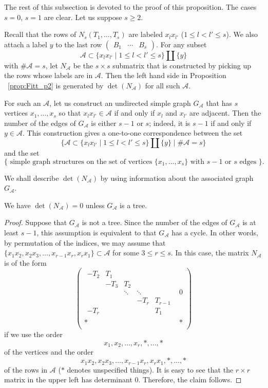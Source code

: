 \documentclass[11pt]{article}
\theoremstyle{definition}
\numberwithin{equation}{section}
\newcommand{\cA}{\mathcal{A}}
\begin{document}
The rest of this subsection is devoted to the proof of this proposition.
The cases $s = 0$, $s = 1$ are clear.
Let us suppose $s \geq 2$.

Recall that the rows of $N_s(T_1, \dots, T_s)$ are labeled $x_l x_{l'}$ ($1 \leq l < l' \leq s$).
We also attach a label $y$ to the last row $\begin{pmatrix} B_1 & \cdots & B_s \end{pmatrix}$.
For any subset 
\[
\cA \subset \{x_l x_{l'} \mid 1 \leq l < l' \leq s\} \amalg \{y\}
\]
with $\# \cA = s$, let $N_{\cA}$ be the $s \times s$ submatrix that is constructed by picking up the rows whose labels are in $\cA$.
Then the left hand side in Proposition ~\ref{prop:Fitt_p2} is generated by $\det(N_{\cA})$ for all such $\cA$.

For such an $\cA$, let us construct an undirected simple graph $G_{\cA}$ that has $s$ vertices $x_1, \dots, x_s$ so that $x_l x_{l'} \in \cA$ if and only if $x_l$ and $x_{l'}$ are adjacent.
Then the number of the edges of $G_{\cA}$ is either $s-1$ or $s$; indeed, it is $s-1$ if and only if $y \in \cA$.
This construction gives a one-to-one correspondence between the set
\[
\{ \cA \subset \{x_l x_{l'} \mid 1 \leq l < l' \leq s\} \amalg \{y\} \mid \# \cA = s\}
\]
and the set
\[
\{ \text{ simple graph structures on the set of vertices $\{x_1, \dots, x_s\}$ with $s-1$ or $s$ edges }\}.
\]

We shall describe $\det(N_{\cA})$ by using information about the associated graph $G_{\cA}$.

\begin{claim}\label{claim2}
We have $\det(N_{\cA}) = 0$ unless $G_{\cA}$ is a tree.
\end{claim}

\begin{proof}
Suppose that $G_{\cA}$ is not a tree.
Since the number of the edges of $G_{\cA}$ is at least $s-1$, this assumption is equivalent to that $G_{\cA}$ has a cycle.
In other words, by permutation of the indices, we may assume that $\{x_1x_2, x_2 x_3, \dots, x_{r-1} x_r, x_r x_1\} \subset \cA$ for some $3 \leq r \leq s$.
In this case, the matrix $N_{\cA}$ is of the form
\[
\begin{pmatrix}
	\begin{matrix}
		-T_2 & T_1 & & & \\
		& -T_3 & T_2 & & \\
		& & \ddots & \ddots & \\
		& & & - T_r & T_{r-1}\\
		-T_r & & & & T_1
	\end{matrix}
 & 0\\
* & * \\
\end{pmatrix}
\]
if we use the order
\[
x_1, x_2, \dots, x_r, *, \dots, *
\]
of the vertices and the order 
\[
x_1x_2, x_2 x_3, \dots, x_{r-1} x_r, x_r x_1, *, \dots, *
\]
 of the rows in $\cA$ ($*$ denotes unspecified things).
It is easy to see that the $r \times r$ matrix in the upper left has determinant $0$.
Therefore, the claim follows.
\end{proof}
\end{document}
